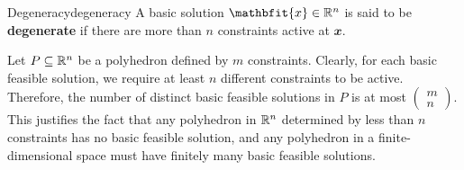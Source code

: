 \documentclass[math, code]{amznotes}
\theoremstyle{remark}
\begin{document}
\begin{dfnbox}{Degeneracy}{degeneracy}
    A basic solution $\mathbfit{x} \in \R^n$ is said to be {\color{red} \textbf{degenerate}} if there are more than $n$ constraints active at $\mathbfit{x}$.
\end{dfnbox}
Let $P \subseteq \mathbb{R}^n$ be a polyhedron defined by $m$ constraints. Clearly, for each basic feasible solution, we require at least $n$ different constraints to be active. Therefore, the number of distinct basic feasible solutions in $P$ is at most $\left(\begin{smallmatrix}
    m \\
    n
\end{smallmatrix}\right)$. This justifies the fact that any polyhedron in $\mathbb{R}^n$ determined by less than $n$ constraints has no basic feasible solution, and any polyhedron in a finite-dimensional space must have finitely many basic feasible solutions.
\end{document}
